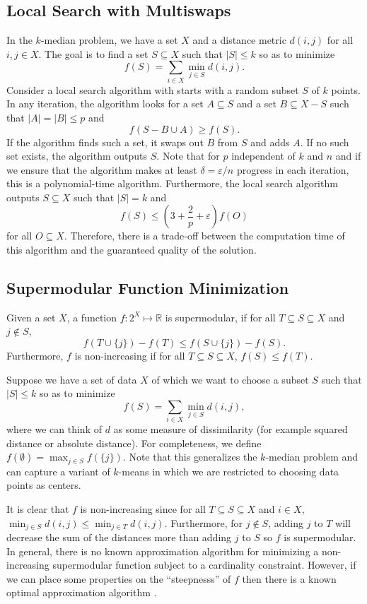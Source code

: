 \documentclass{article}
\begin{document}
\subsection{Local Search with Multiswaps}
In the $k$-median problem, we have a set $X$ and a distance metric $d(i,j)$ for all $i,j \in X$. The goal is to find a set $S \subseteq X$ such that $|S| \leq k$ so as to minimize 
\[ f(S) = \sum_{ i\in X} \min_{j \in S} d(i,j). \]
Consider a local search algorithm with starts with a random subset $S$ of $k$ points. In any iteration, the algorithm looks for a set $A \subseteq S$ and a set $B \subseteq X -S$ such that $|A| = |B| \leq p$ and
\[ f(S- B \cup A) \geq f(S). \]
If the algorithm finds such a set, it swaps out $B$ from $S$ and adds $A$. If no such set exists, the algorithm outputs $S$. Note that for $p$ independent of $k$ and $n$ and if we ensure that the algorithm makes at least $\delta = \varepsilon/n$ progress in each iteration, this is a polynomial-time algorithm. Furthermore, the local search algorithm outputs $S \subseteq X$ such that $|S| = k$ and
\[ f(S) \leq \left (3 + \frac{2}{p}+\varepsilon \right ) f(O) \]
for all $O \subseteq X$. Therefore, there is a trade-off between the computation time of this algorithm and the guaranteed quality of the solution. 

\subsection{Supermodular Function Minimization}
Given a set $X$, a function $f:2^{X} \mapsto \mathbb{R}$ is supermodular, if for all $T \subseteq S \subseteq X$ and $j \notin S$, 
\[ f(T \cup \{j\}) - f(T) \leq f(S \cup \{j\}) - f(S). \]
Furthermore, $f$ is non-increasing if for all $T \subseteq S \subseteq X$, $f(S) \leq f(T)$. 

Suppose we have a set of data $X$ of which we want to choose a subset $S$ such that $|S| \leq k$ so as to minimize 
\[ f(S) = \sum_{i \in X} \min_{j \in S} d(i,j) ,\]
where we can think of $d$ as some measure of dissimilarity (for example squared distance or absolute distance). For completeness, we define $f(\emptyset) = \max_{j \in S} f(\{j\})$. 
Note that this generalizes the $k$-median problem and can capture a variant of $k$-means in which we are restricted to choosing data points as centers.

It is clear that $f$ is non-increasing since for all $T \subseteq S \subseteq X$ and $i \in X$, $\min_{j \in S} d(i,j) \leq \min_{j \in T} d(i,j)$. Furthermore, for $j \notin S$, adding $j$ to $T$ will decrease the sum of the distances more than adding $j$ to $S$ so $f$ is supermodular. In general, there is no known approximation algorithm for minimizing a non-increasing supermodular function subject to a cardinality constraint. However, if we can place some properties on the ``steepnesss'' of $f$ then there is a known optimal approximation algorithm \cite{Sviridenko}.
\end{document}
